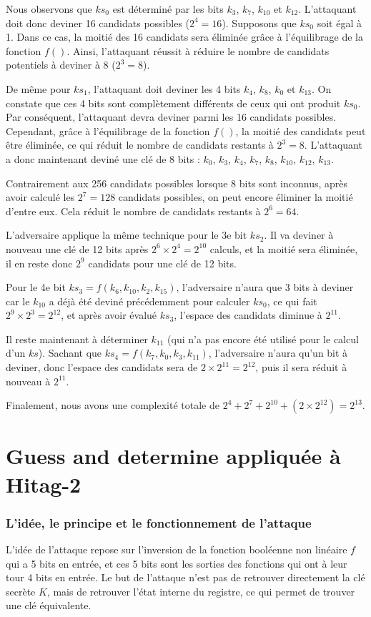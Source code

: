 \documentclass{template}
\begin{document}
Nous observons que $ks_0$ est déterminé par les bits $k_3$, $k_7$, $k_{10}$ et $k_{12}$. L'attaquant doit donc deviner 16 candidats possibles ($2^4 = 16$). Supposons que $ks_0$ soit égal à 1. Dans ce cas, la moitié des 16 candidats sera éliminée grâce à l'équilibrage de la fonction $f()$. Ainsi, l'attaquant réussit à réduire le nombre de candidats potentiels à deviner à 8 ($2^3 = 8$).

De même pour $ks_1$, l'attaquant doit deviner les 4 bits $k_4$, $k_8$, $k_0$ et $k_{13}$. On constate que ces 4 bits sont complètement différents de ceux qui ont produit $ks_0$. Par conséquent, l'attaquant devra deviner parmi les 16 candidats possibles. Cependant, grâce à l'équilibrage de la fonction $f()$, la moitié des candidats peut être éliminée, ce qui réduit le nombre de candidats restants à $2^3 = 8$. L'attaquant a donc maintenant deviné une clé de 8 bits : $k_0$, $k_3$, $k_4$, $k_7$, $k_8$, $k_{10}$, $k_{12}$, $k_{13}$.

Contrairement aux 256 candidats possibles lorsque 8 bits sont inconnus, après avoir calculé les $2^7 = 128$ candidats possibles, on peut encore éliminer la moitié d'entre eux. Cela réduit le nombre de candidats restants à $2^6 = 64$.

L'adversaire applique la même technique pour le 3e bit $ks_2$. Il va deviner à nouveau une clé de 12 bits après $2^6 \times 2^4 = 2^{10}$ calculs, et la moitié sera éliminée, il en reste donc $2^9$ candidats pour une clé de 12 bits.

Pour le 4e bit $ks_3 = f(k_6, k_{10}, k_2, k_{15})$, l'adversaire n'aura que 3 bits à deviner car le $k_{10}$ a déjà été deviné précédemment pour calculer $ks_0$, ce qui fait $2^9 \times 2^3 = 2^{12}$, et après avoir évalué $ks_3$, l'espace des candidats diminue à $2^{11}$.

Il reste maintenant à déterminer $k_{11}$ (qui n'a pas encore été utilisé pour le calcul d'un $ks$). Sachant que $ks_4 = f(k_7, k_0, k_3, k_{11})$, l'adversaire n'aura qu'un bit à deviner, donc l'espace des candidats sera de $2 \times 2^{11} = 2^{12}$, puis il sera réduit à nouveau à $2^{11}$.

Finalement, nous avons une complexité totale de $2^4 + 2^7 + 2^{10} + (2 \times 2^{12}) = 2^{13}$.

\section{Guess and determine appliquée à Hitag-2}
\subsubsection{L'idée, le principe et le fonctionnement de l'attaque}
\baselineskip=16pt
L'idée de l'attaque repose sur l'inversion de la fonction booléenne non linéaire $f$ qui a 5 bits en entrée, et ces 5 bits sont les sorties des fonctions qui ont à leur tour 4 bits en entrée. Le but de l'attaque n'est pas de retrouver directement la clé secrète $K$, mais de retrouver l'état interne du registre, ce qui permet de trouver une clé équivalente.
\end{document}
